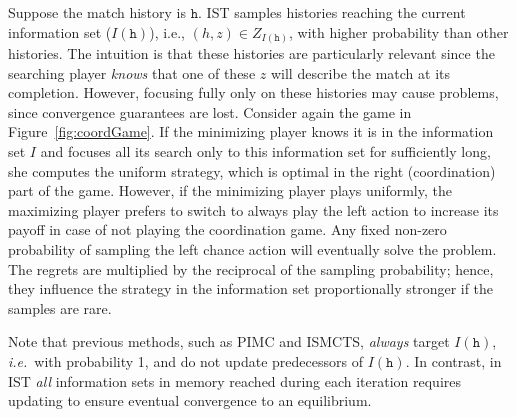 \documentclass{aamas2015}
\newcounter{vlNoteCounter}
\newcommand{\vlnote}[1]{{\scriptsize \color{blue} $\blacksquare$ \refstepcounter{vlNoteCounter}\textsf{[VL]$_{\arabic{vlNoteCounter}}$:{#1}}}}
\newcommand{\tth}{\mathtt{h}}
\newcommand{\ie}{{\it i.e.}~}
\begin{document}
Suppose the match history is $\tth$. IST samples histories reaching the current information set ($I(\tth)$), 
i.e., $(h,z) \in Z_{I(\tth)}$, with higher probability than other histories.
The intuition is that these histories are particularly 
relevant since the searching player {\it knows} that one of these $z$ will describe the match at its completion. 
However, focusing fully only on these histories may cause problems, since convergence guarantees are lost.
Consider again the game in Figure~\ref{fig:coordGame}. 
If the minimizing player knows it is in the information set $I$ and focuses all its search only to this information set for sufficiently long, she computes the uniform strategy, which is optimal in the right (coordination) part of the game.
However, if the minimizing player plays uniformly, the maximizing player prefers to switch to always play the left action to increase its payoff in case of not playing the coordination game. Any fixed non-zero probability of sampling the left chance action will 
eventually solve the problem. The regrets are multiplied by the reciprocal of the sampling probability; hence, they influence the strategy 
in the information set proportionally stronger if the samples are rare. 

Note that previous methods, such as PIMC and ISMCTS, {\it always} target $I(\tth)$, \ie with probability 1, and do not 
update predecessors of $I(\tth)$. In contrast, in IST {\it all} information sets in memory reached during each iteration requires updating 
to ensure eventual convergence to an equilibrium.


\end{document}
